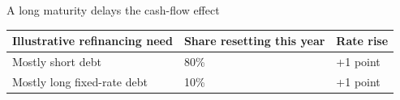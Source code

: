 \documentclass[12pt,aspectratio=169]{beamer}
\begin{document}

\begin{frame}{A long maturity delays the cash-flow effect}
\begin{center}\begin{tabular}{@{}lll@{}}\toprule \textbf{Illustrative refinancing need} & \textbf{Share resetting this year} & \textbf{Rate rise}\\\midrule Mostly short debt & 80\% & +1 point\\[2mm]
Mostly long fixed-rate debt & 10\% & +1 point\\\bottomrule\end{tabular}\end{center}
\end{frame}

\end{document}

